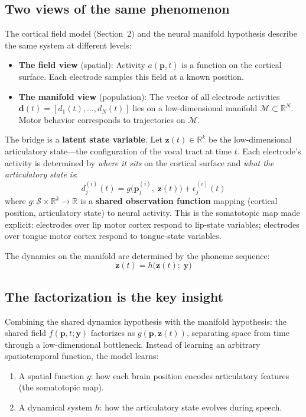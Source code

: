 \documentclass[11pt,letterpaper]{article}
\newcommand{\bfp}{\mathbf{p}}
\newcommand{\bfz}{\mathbf{z}}
\newcommand{\bfy}{\mathbf{y}}
\newcommand{\bfd}{\mathbf{d}}
\newcommand{\cS}{\mathcal{S}}
\newcommand{\cM}{\mathcal{M}}
\newcommand{\R}{\mathbb{R}}
\begin{document}
\subsection{Two views of the same phenomenon}

The cortical field model (Section~2) and the neural manifold hypothesis describe the same system at different levels:
\begin{itemize}[leftmargin=2em]
\item \textbf{The field view} (spatial): Activity $a(\bfp, t)$ is a function on the cortical surface. Each electrode samples this field at a known position.
\item \textbf{The manifold view} (population): The vector of all electrode activities $\bfd(t) = [d_1(t), \ldots, d_N(t)]$ lies on a low-dimensional manifold $\cM \subset \R^N$. Motor behavior corresponds to trajectories on $\cM$.
\end{itemize}

The bridge is a \textbf{latent state variable}. Let $\bfz(t) \in \R^k$ be the low-dimensional articulatory state---the configuration of the vocal tract at time $t$. Each electrode's activity is determined by \emph{where it sits} on the cortical surface and \emph{what the articulatory state is}:
\begin{equation}\label{eq:obs-function}
\boxed{d_j^{(i)}(t) = g\bigl(\bfp_j^{(i)},\; \bfz(t)\bigr) + \epsilon_j^{(i)}(t)}
\end{equation}
where $g: \cS \times \R^k \to \R$ is a \textbf{shared observation function} mapping (cortical position, articulatory state) to neural activity. This is the somatotopic map made explicit: electrodes over lip motor cortex respond to lip-state variables; electrodes over tongue motor cortex respond to tongue-state variables.

The dynamics on the manifold are determined by the phoneme sequence:
\begin{equation}\label{eq:dynamics}
\dot{\bfz}(t) = h\bigl(\bfz(t);\; \bfy\bigr)
\end{equation}

\subsection{The factorization is the key insight}

Combining the shared dynamics hypothesis with the manifold hypothesis: the shared field $f(\bfp, t; \bfy)$ factorizes as $g(\bfp, \bfz(t))$, separating space from time through a low-dimensional bottleneck. Instead of learning an arbitrary spatiotemporal function, the model learns:
\begin{enumerate}[leftmargin=2em]
\item A spatial function $g$: how each brain position encodes articulatory features (the somatotopic map).
\item A dynamical system $h$: how the articulatory state evolves during speech.
\end{enumerate}
\end{document}

